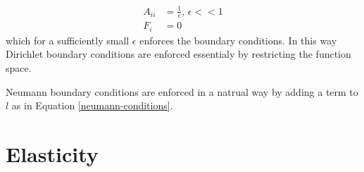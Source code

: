 \documentclass[11pt,a4paper,english]{elsarticle}%
\begin{document}
\begin{equation*}
    \begin{aligned}
    A_{ii} &= \frac{1}{\epsilon}, \, \epsilon << 1 \\
    F_i &= 0
    \end{aligned}
\end{equation*}
which for a sufficiently small $\epsilon$ enforces the boundary conditions. In this way Dirichlet boundary conditions are enforced essentialy by restricting the function space. 

Neumann boundary conditions are enforced in a natrual way by adding a term to $l$ as in Equation \eqref{neumann-conditions}.

\section{Elasticity }
\end{document}
